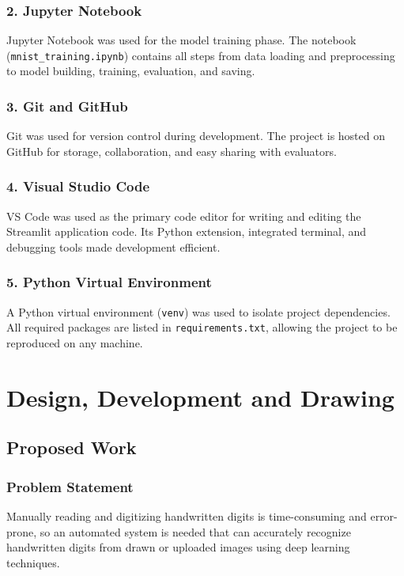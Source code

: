\documentclass[12pt,a4paper]{report}
\begin{document}
\subsection*{2. Jupyter Notebook}
Jupyter Notebook was used for the model training phase. The notebook (\texttt{mnist\_training.ipynb}) contains all steps from data loading and preprocessing to model building, training, evaluation, and saving.

\subsection*{3. Git and GitHub}
Git was used for version control during development. The project is hosted on GitHub for storage, collaboration, and easy sharing with evaluators.

\subsection*{4. Visual Studio Code}
VS Code was used as the primary code editor for writing and editing the Streamlit application code. Its Python extension, integrated terminal, and debugging tools made development efficient.

\subsection*{5. Python Virtual Environment}
A Python virtual environment (\texttt{venv}) was used to isolate project dependencies. All required packages are listed in \texttt{requirements.txt}, allowing the project to be reproduced on any machine.

\chapter{Design, Development and Drawing}
\section{Proposed Work}
\subsection{Problem Statement}
Manually reading and digitizing handwritten digits is time-consuming and error-prone, so an automated system is needed that can accurately recognize handwritten digits from drawn or uploaded images using deep learning techniques.
\end{document}
